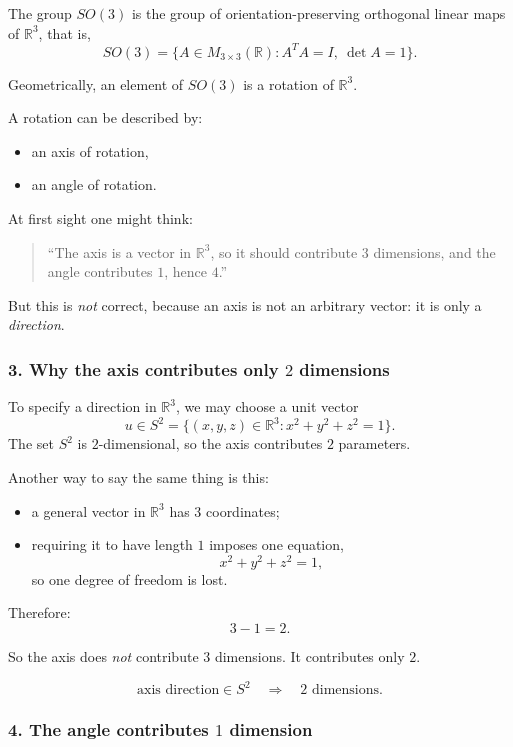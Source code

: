\documentclass[12pt,a4paper]{article}
\theoremstyle{notespace}
\begin{document}
The group \(SO(3)\) is the group of orientation-preserving orthogonal linear maps of \(\mathbb R^3\), that is,
\[
SO(3)=\{A\in M_{3\times 3}(\mathbb R): A^TA=I,\ \det A=1\}.
\]

Geometrically, an element of \(SO(3)\) is a rotation of \(\mathbb R^3\).

A rotation can be described by:
\begin{itemize}
	\item an axis of rotation,
	\item an angle of rotation.
\end{itemize}

At first sight one might think:
\begin{quote}
	``The axis is a vector in \(\mathbb R^3\), so it should contribute \(3\) dimensions, and the angle contributes \(1\), hence \(4\).''
\end{quote}
But this is \emph{not} correct, because an axis is not an arbitrary vector: it is only a \emph{direction}.

\subsubsection*{3. Why the axis contributes only \texorpdfstring{\(2\)}{2} dimensions}

To specify a direction in \(\mathbb R^3\), we may choose a unit vector
\[
u\in S^2=\{(x,y,z)\in \mathbb R^3 : x^2+y^2+z^2=1\}.
\]
The set \(S^2\) is \(2\)-dimensional, so the axis contributes \(2\) parameters.

Another way to say the same thing is this:

\begin{itemize}
	\item a general vector in \(\mathbb R^3\) has \(3\) coordinates;
	\item requiring it to have length \(1\) imposes one equation,
	\[
	x^2+y^2+z^2=1,
	\]
	so one degree of freedom is lost.
\end{itemize}

Therefore:
\[
3-1=2.
\]

So the axis does \emph{not} contribute \(3\) dimensions. It contributes only \(2\).

\[
\boxed{\text{axis direction} \in S^2 \quad \Longrightarrow \quad 2\text{ dimensions}.}
\]

\subsubsection*{4. The angle contributes \texorpdfstring{\(1\)}{1} dimension}
\end{document}
